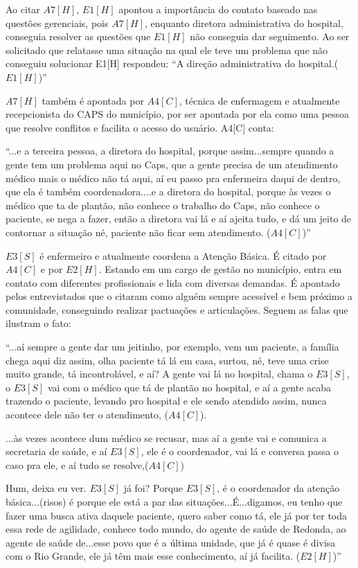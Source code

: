 Ao citar $A7[H]$, $E1[H]$ apontou a importância do contato baseado nas questões gerenciais, pois $A7[H]$, enquanto diretora administrativa do hospital, conseguia resolver as questões que $E1[H]$ não conseguia dar seguimento. Ao ser solicitado que relatasse uma situação na qual ele teve um problema que não conseguiu solucionar E1[H] respondeu: ``A direção administrativa do hospital.($E1[H]$)''

$A7[H]$ também é apontada por $A4[C]$, técnica de enfermagem e atualmente recepcionista do CAPS do município, por ser apontada por ela como uma pessoa que resolve conflitos e facilita o acesso do usuário. A4[C] conta: 

\begin{citacao}
``...e a terceira pessoa, a diretora do hospital, porque assim...sempre quando a gente tem um problema aqui no Caps, que a gente precisa de um atendimento médico mais o médico não tá aqui, aí eu passo pra enfermeira daqui de dentro, que ela é também coordenadora....e a diretora do hospital, porque às vezes o médico que ta de plantão, não conhece o trabalho do Caps, não conhece o paciente, se nega a fazer, então a diretora vai lá e aí ajeita tudo, e dá um jeito de contornar a situação né, paciente não ficar sem atendimento. ($A4[C]$)''
\end{citacao}


$E3[S]$ é enfermeiro e atualmente coordena a Atenção Básica. É citado por $A4[C]$ e por $E2[H]$. Estando em um cargo de gestão no município, entra em contato com diferentes profissionais e lida com diversas demandas. É apontado pelos entrevistados que o citaram como alguém sempre acessível e bem próximo a comunidade, conseguindo realizar pactuações e articulações. Seguem as falas que ilustram o fato:

\begin{citacao}
 ``...aí sempre a gente dar um jeitinho, por exemplo, vem um paciente, a família chega aqui diz assim, olha paciente tá lá em casa, surtou, né, teve uma crise muito grande, tá incontrolável, e aí? A gente vai lá no hospital, chama o $E3[S]$, o $E3[S]$ vai com o médico que tá de plantão no hospital, e aí a gente acaba trazendo o paciente, levando pro hospital e ele sendo atendido assim, nunca acontece dele não ter o atendimento, ($A4[C]$).
 
...às vezes acontece dum médico se recusar, mas aí a gente vai e comunica a secretaria de saúde, e aí $E3[S]$, ele é o coordenador, vai lá e conversa passa o caso pra ele, e aí tudo se resolve,($A4[C]$)

Hum, deixa eu ver. $E3[S]$ já foi? Porque $E3[S]$, é o coordenador da atenção básica...(risos) é porque ele está a par das situações...É...digamos, eu tenho que fazer uma busca ativa daquele paciente, quero saber como tá, ele já por ter toda essa rede de agilidade, conhece todo mundo, do agente de saúde de Redonda, ao agente de saúde de...esse povo que é a última unidade, que já é quase é  divisa com o Rio Grande, ele já têm mais esse conhecimento, aí já facilita. ($E2[H]$)''
\end{citacao}

